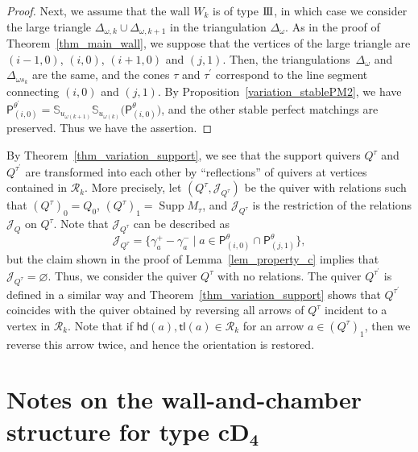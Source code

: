 \documentclass[pdftex]{sigma}
\numberwithin{equation}{section}
\theoremstyle{definition}
\newcommand{\BS}{\mathbb{S}}
\newcommand{\calJ}{\mathcal{J}}
\newcommand{\calR}{\mathcal{R}}
\newcommand{\sfP}{\mathsf{P}}
\newcommand{\Supp}{\operatorname{Supp}}
\newcommand{\hd}{\mathsf{hd}}
\newcommand{\tl}{\mathsf{tl}}
\newcommand{\typeIII}{{\rm I\hspace{-0.7pt}I\hspace{-0.7pt}I}}
\newcommand{\permII}{\omega}
\begin{document}
\begin{proof}
Next, we assume that the wall $W_k$ is of type $\typeIII$, in which case
we consider the large triangle $\Delta_{\permII,k}\cup\Delta_{\permII,k+1}$ in the triangulation $\Delta_{\permII}$.
As in the proof of Theorem~\ref{thm_main_wall}, we suppose that the vertices of the large triangle are $(i-1, 0)$, $(i,0)$, $(i+1,0)$ and $(j,1)$.
Then, the triangulations~$\Delta_\permII$ and $\Delta_{\permII s_k}$ are the same, and
the cones $\tau$ and $\tau^\prime$ correspond to the line segment connecting $(i, 0)$ and $(j,1)$.
By Proposition~\ref{variation_stablePM2}, we have
$
\sfP^{\theta^\prime}_{(i,0)}=\BS_{u_{\permII(k+1)}}\BS_{u_{\permII(k)}}\bigl(\sfP^\theta_{(i,0)}\bigr)$,
and the other stable perfect matchings are preserved. Thus we have the assertion.
\end{proof}

By Theorem~\ref{thm_variation_support}, we see that the support quivers $Q^\tau$ and $Q^{\tau^\prime}$ are
transformed into each other by ``reflections'' of quivers at vertices contained in $\calR_k$.
More precisely, let $(Q^\tau, \calJ_{Q^\tau})$ be the quiver with relations such that $(Q^\tau)_0=Q_0$, $(Q^\tau)_1=\Supp M_\tau$,
and $\calJ_{Q^\tau}$ is the restriction of the relations $\calJ_Q$ on $Q^\tau$.
Note that $\calJ_{Q^\tau}$ can be described as
\[
\calJ_{Q^\tau}=\bigl\{\gamma_a^+-\gamma_a^- \mid a\in \sfP^\theta_{(i,0)}\cap\sfP^\theta_{(j,1)} \bigr\},
\]
but the claim shown in the proof of Lemma~\ref{lem_property_c} implies that $\calJ_{Q^\tau}=\varnothing$.
Thus, we consider the quiver $Q^\tau$ with no relations.
The quiver $Q^{\tau^\prime}$ is defined in a similar way and Theorem~\ref{thm_variation_support} shows that
$Q^{\tau^\prime}$ coincides with the quiver obtained by reversing all arrows of $Q^\tau$ incident to a vertex in $\calR_k$.
Note that if $\hd(a), \tl(a)\in\calR_k$ for an arrow $a\in (Q^\tau)_1$, then we reverse this arrow twice, and hence the orientation is restored.

\section[Notes on the wall-and-chamber structure for type cD\_4]{Notes on the wall-and-chamber structure for type $\boldsymbol{cD_4}$}
\label{sec_D4}
\end{document}
